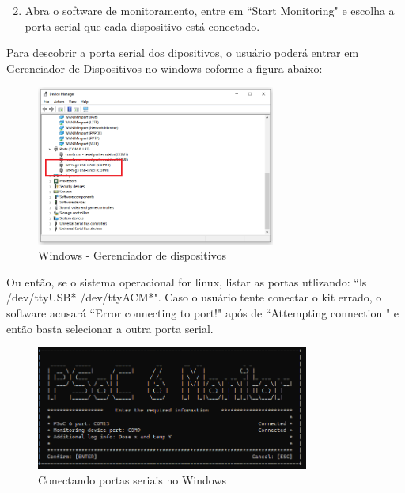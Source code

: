 \documentclass[12pt, a4paper]{article}
\begin{document}
\begin{enumerate}[leftmargin=1.3cm]
    \setcounter{enumi}{1}
    \item  Abra o software de monitoramento, entre em ``Start Monitoring" e escolha a porta serial que cada dispositivo está conectado.
\end{enumerate}

Para descobrir a porta serial dos dipositivos, o usuário poderá entrar em Gerenciador de Dispositivos no windows coforme a figura abaixo:

\begin{figure}[H]
    \centering
    \caption{Windows - Gerenciador de dispositivos}
    \includegraphics[width=0.7\textwidth]{../imgs/device_manager.png}

    \vspace{0.5em}
    \label{fig:device_manager}
\end{figure}

Ou então, se o sistema operacional for linux, listar as portas utlizando: ``ls /dev/ttyUSB* /dev/ttyACM*". Caso o usuário tente conectar o kit errado, o software acusará ``Error connecting to port!" após de ``Attempting connection " e então basta selecionar a outra porta serial.

\begin{figure}[H]
    \centering
    \caption{Conectando portas seriais no Windows}
    \includegraphics[width=0.8\textwidth]{../imgs/serial_windows.png}

    \vspace{0.5em}
    \label{fig:serial_linux}
\end{figure}
\end{document}
